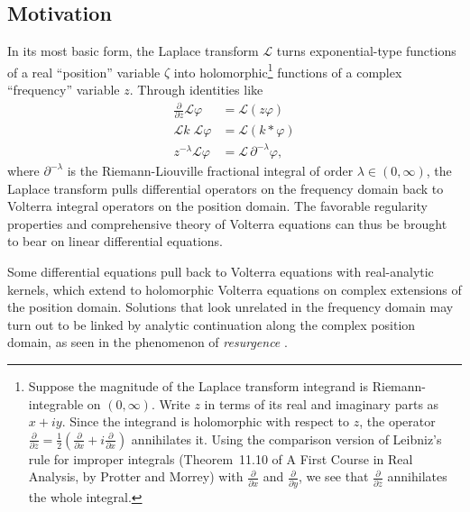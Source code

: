 \documentclass{article}
\theoremstyle{plain}
\newcommand{\laplace}{\mathcal{L}}
\newenvironment{verify}{\color{ForestGreen}}{\color{black}}
\begin{document}
\subsection{Motivation}\label{motivation}
In its most basic form, the Laplace transform $\laplace$ turns exponential-type functions of a real ``position'' variable $\zeta$ into holomorphic\begin{verify}\footnote{\begin{verify}Suppose the magnitude of the Laplace transform integrand is Riemann-integrable on $(0, \infty)$. Write $z$ in terms of its real and imaginary parts as $x + iy$. Since the integrand is holomorphic with respect to $z$, the operator $\frac{\partial}{\partial\overline{z}} = \frac{1}{2}\left(\frac{\partial}{\partial x} + i\frac{\partial}{\partial x}\right)$ annihilates it. Using the comparison version of Leibniz's rule for improper integrals (Theorem~11.10 of A First Course in Real Analysis, by Protter and Morrey) with $\frac{\partial}{\partial x}$ and $\frac{\partial}{\partial y}$, we see that $\frac{\partial}{\partial\overline{z}}$ annihilates the whole integral.\end{verify}}\end{verify} functions of a complex ``frequency'' variable $z$. Through identities like
\begin{align*}
\frac{\partial}{\partial z} \laplace \varphi & = \laplace(z\varphi) \\
\laplace k\;\laplace \varphi & = \laplace(k * \varphi) \\
z^{-\lambda} \laplace \varphi & = \laplace\,\partial^{-\lambda} \varphi,
\end{align*}
where $\partial^{-\lambda}$ is the Riemann-Liouville fractional integral of order $\lambda \in (0, \infty)$, the Laplace transform pulls differential operators on the frequency domain back to Volterra integral operators on the position domain. The favorable regularity properties and comprehensive theory of Volterra equations can thus be brought to bear on linear differential equations.

Some differential equations pull back to Volterra equations with real-analytic kernels, which extend to holomorphic Volterra equations on complex extensions of the position domain. Solutions that look unrelated in the frequency domain may turn out to be linked by analytic continuation along the complex position domain, as seen in the phenomenon of {\em resurgence} \cite{EcalleIII}\cite{lectures-marino}\cite[Section 2.4]{sternin1995borel}.
\end{document}
